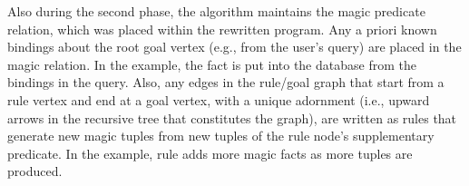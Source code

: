 Also during the second phase, the algorithm maintains the magic predicate
relation, which was placed within the rewritten program.  Any a priori known
bindings about the root goal vertex (e.g., from the user's query) are placed in
the magic relation.  In the example, the fact  is
put into the database from the bindings in the  query.  Also, any
edges in the rule/goal graph that start from a rule vertex and end at a goal
vertex, with a unique adornment (i.e., upward arrows in the recursive tree that
constitutes the graph), are written as rules that generate new magic tuples
from new tuples of the rule node's supplementary predicate.  In the example,
rule  adds more magic facts as more  tuples are
produced.

%
